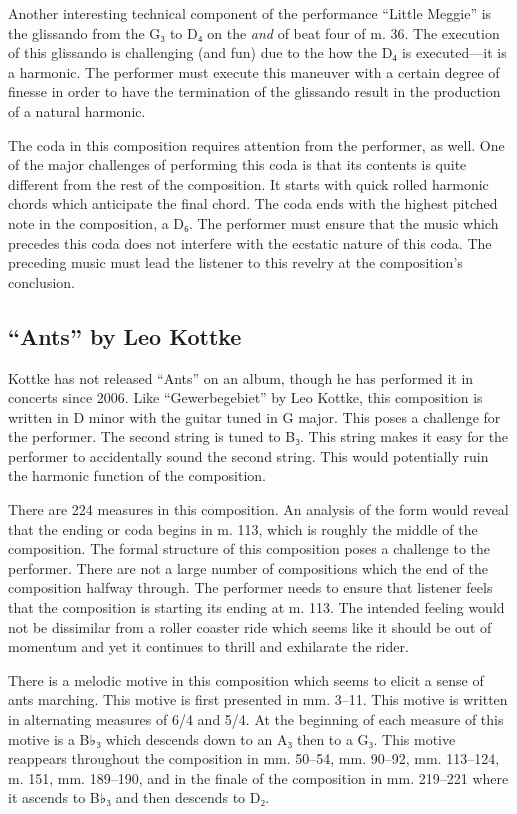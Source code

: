 \documentclass{tufte-handout}
\begin{document}
Another interesting technical component of the performance ``Little Meggie'' is the glissando from the G₃ to D₄ on the \emph{and} of beat four of m. 36. The execution of this glissando is challenging (and fun) due to the how the D₄ is executed—it is a harmonic. The performer must execute this maneuver with a certain degree of finesse in order to have the termination of the glissando result in the production of a natural harmonic.

  The coda in this composition requires attention from the performer, as well. One of the major challenges of performing this coda is that its contents is quite different from the rest of the composition. It starts with quick rolled harmonic chords which anticipate the final chord. The coda ends with the highest pitched note in the composition, a D₆. The performer must ensure that the music which precedes this coda does not interfere with the ecstatic nature of this coda. The preceding music must lead the listener to this revelry at the composition's conclusion. 

\subsection*{``Ants'' by Leo Kottke}
\label{sec:ants-leo-kottke}
Kottke has not released ``Ants'' on an album, though he has performed it in concerts since 2006. Like ``Gewerbegebiet'' by Leo Kottke, this composition is written in D minor with the guitar tuned in G major. This poses a challenge for the performer. The second string is tuned to B₃. This string makes it easy for the performer to accidentally sound the second string. This would potentially ruin the harmonic function of the composition. 

There are 224 measures in this composition. An analysis of the form would reveal that the ending or coda begins in m. 113, which is roughly the middle of the composition. The formal structure of this composition poses a challenge to the performer. There are not a large number of compositions which the end of the composition halfway through. The performer needs to ensure that listener feels that the composition is starting its ending at m. 113. The intended feeling would not be dissimilar from a roller coaster ride which seems like it should be out of momentum and yet it continues to thrill and exhilarate the rider.

There is a melodic motive in this composition which seems to elicit a sense of ants marching. This motive is first presented in mm. 3--11. This motive is written in alternating measures of 6/4 and 5/4. At the beginning of each measure of this motive is a B♭₃ which descends down to an A₃ then to a G₃. This motive reappears throughout the composition in mm. 50--54, mm. 90--92, mm. 113--124, m. 151, mm. 189--190, and in the finale of the composition in mm. 219--221 where it ascends to B♭₃ and then descends to D₂. 
\end{document}

